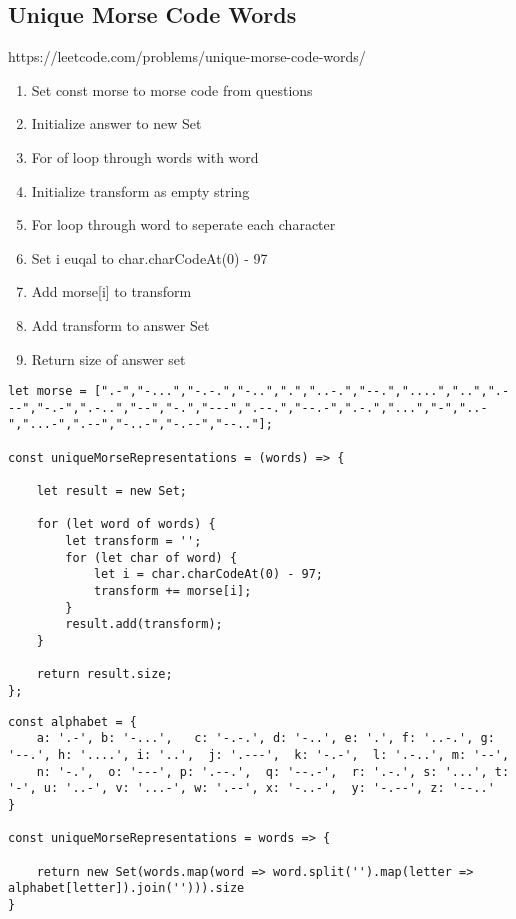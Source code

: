 \documentclass[10pt]{article}
\begin{document}
\pagebreak %
\medskip 
\subsection{Unique Morse Code Words}
https://leetcode.com/problems/unique-morse-code-words/

\begin{enumerate}
	\item Set const morse to morse code from questions
	\item Initialize answer to new Set
	\item For of loop through words with word
	\item Initialize transform as empty string
	\item For loop through word to seperate each character
	\item Set i euqal to char.charCodeAt(0) - 97
	\item Add morse[i] to transform 
	\item Add transform to answer Set
	\item Return size of answer set
\end{enumerate}

\begin{lstlisting}[title=Solution uniqueMorseRepresentations, captionpos=t]
let morse = [".-","-...","-.-.","-..",".","..-.","--.","....","..",".---","-.-",".-..","--","-.","---",".--.","--.-",".-.","...","-","..-","...-",".--","-..-","-.--","--.."];

const uniqueMorseRepresentations = (words) => {
    
    let result = new Set;
    
    for (let word of words) {
        let transform = '';
        for (let char of word) {
            let i = char.charCodeAt(0) - 97;
            transform += morse[i];
        }
        result.add(transform);
    }
    
    return result.size;
};
\end{lstlisting}


\begin{lstlisting}[title=Solution uniqueMorseRepresentations with object, captionpos=t]
const alphabet = {
    a: '.-', b: '-...',   c: '-.-.', d: '-..', e: '.', f: '..-.', g: '--.', h: '....', i: '..',  j: '.---',  k: '-.-',  l: '.-..', m: '--',
    n: '-.',  o: '---', p: '.--.',  q: '--.-',  r: '.-.', s: '...', t: '-', u: '..-', v: '...-', w: '.--', x: '-..-',  y: '-.--', z: '--..' 
}

const uniqueMorseRepresentations = words => {  

    return new Set(words.map(word => word.split('').map(letter => alphabet[letter]).join(''))).size
}
\end{lstlisting}
\end{document}
